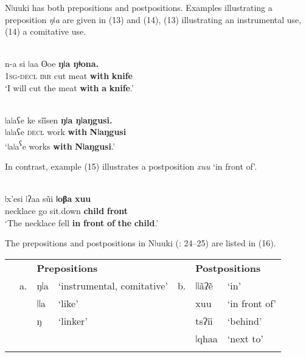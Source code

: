 \documentclass[output=paper]{langsci/langscibook}
\begin{document}
Nǀuuki has both prepositions and postpositions. Examples illustrating a preposition \textit{ŋǀa} are given in (13) and (14), (13) illustrating an instrumental use, (14) a comitative use.

\ea\label{ex:dryer:}
\\
\gll n-a  si  ǀaa  ʘoe  \textbf{ŋǀa  ŋǂona.}\\
       \textsc{1sg-decl}  \textsc{irr}  cut  meat  \textbf{with}  \textbf{knife}  \\
\glt ‘I will cut the meat \textbf{with} \textbf{a} \textbf{knife}.’  
\z

\ea\label{ex:dryer:}
\\
\gll ǀaǀaʕe  ke  sĩĩsen  \textbf{ŋǀa  ŋǀaŋgusi.}\\
       ǀaǀaʕe  \textsc{decl}  work  \textbf{with}  \textbf{Nǀaŋgusi}  \\
\glt ‘ǀaǀa\textsuperscript{ʕ}e works \textbf{with} \textbf{Nǀaŋgusi}.’  
\z

In contrast, example (15) illustrates a postposition \textit{xuu} ‘in front of’.

\ea\label{ex:dryer:}
\\
\gll ǀx’esi  ǀʔaa  s\~ui  \textbf{ǀoβa}  \textbf{xuu}\\
       necklace  go  sit.down  \textbf{child}  \textbf{front}  \\
\glt ‘The necklace fell \textbf{in} \textbf{front} \textbf{of} \textbf{the} \textbf{child}.’ 
\z

The prepositions and postpositions in Nǀuuki (\citealt{CollinsNamaseb2011}: 24–25) are listed in (16).


\begin{table}
\begin{tabularx}{\textwidth}{XXXXXXX} 
\lsptoprule
&  & \multicolumn{2}{X}{\bfseries Prepositions} &  & \multicolumn{2}{X}{\bfseries Postpositions}\\
& a. & ŋǀa & ‘instrumental, comitative’ & b. & ǀǀãʔẽ & ‘in’\\
&  & ǀǀa & ‘like’ &  & xuu & ‘in front of’\\
&  & ŋ & ‘linker’ &  & tsʔĩi & ‘behind’\\
&  &  &  &  & ǀqhaa & ‘next to’\\
\lspbottomrule
\end{tabularx}
\end{table}
\end{document}

